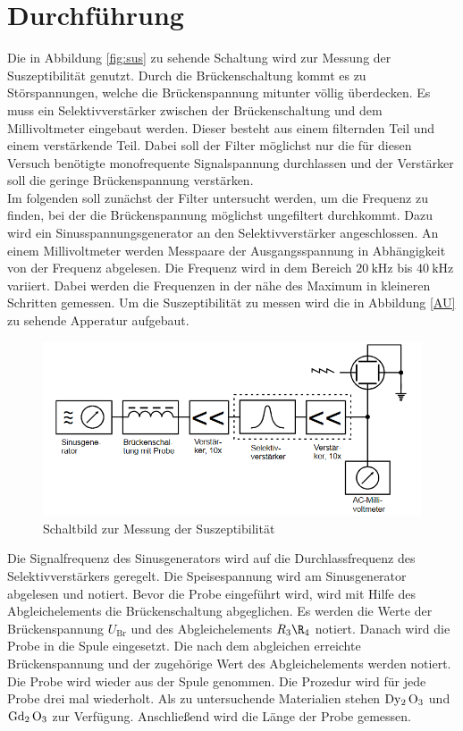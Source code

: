 \section{Durchführung}
\label{sec:Durchführung}
Die in Abbildung \ref{fig:sus} zu sehende Schaltung wird zur Messung der Suszeptibilität genutzt.
Durch die Brückenschaltung kommt es zu Störspannungen, welche die Brückenspannung mitunter völlig überdecken. Es muss ein Selektivverstärker zwischen der Brückenschaltung und dem Millivoltmeter eingebaut werden.
Dieser besteht aus einem filternden Teil und einem verstärkende Teil. Dabei soll der Filter möglichst nur die für diesen Versuch benötigte monofrequente Signalspannung durchlassen und der Verstärker 
soll die geringe Brückenspannung verstärken.
\\
Im folgenden soll zunächst der Filter untersucht werden, um die Frequenz zu finden, bei der die Brückenspannung möglichst ungefiltert durchkommt.
Dazu wird ein Sinusspannungsgenerator an den Selektivverstärker angeschlossen. An einem Millivoltmeter werden Messpaare der Ausgangsspannung in Abhängigkeit von der
Frequenz abgelesen. Die Frequenz wird in dem Bereich $\SI{20}{\kilo \hertz}$ bis $\SI{40}{\kilo \hertz}$ variiert. Dabei werden die Frequenzen in der nähe des Maximum in kleineren Schritten gemessen.
Um die Suszeptibilität zu messen wird die in Abbildung \ref{AU} zu sehende Apperatur aufgebaut.
\begin{figure}
    \centering
    \includegraphics[scale=0.4]{pics/AU.png}
    \caption{Schaltbild zur Messung der Suszeptibilität \cite{v606}}
    \label{fig:AU}
  \end{figure}
  Die Signalfrequenz des Sinusgenerators wird auf die Durchlassfrequenz des Selektivverstärkers geregelt. Die Speisespannung wird am Sinusgenerator abgelesen und notiert.
  Bevor die Probe eingeführt wird, wird mit Hilfe des Abgleichelements die Brückenschaltung abgeglichen. Es werden die Werte der Brückenspannung $U_\text{Br}$ und des Abgleichelements $R_3\R_4$ notiert.
  Danach wird die Probe in die Spule eingesetzt. Die nach dem abgleichen erreichte Brückenspannung und der zugehörige Wert des Abgleichelements werden notiert.
  Die Probe wird wieder aus der Spule genommen. Die Prozedur wird für jede Probe drei mal wiederholt. Als zu untersuchende Materialien stehen $\ce{Dy2 O3}$ und $\ce{Gd2 O3}$ zur Verfügung.
  Anschließend wird die Länge der Probe gemessen.